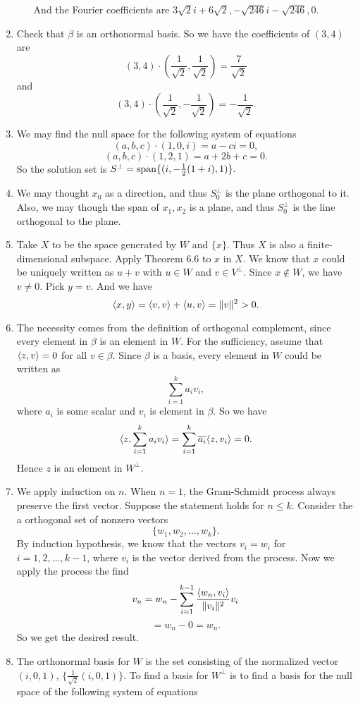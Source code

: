 \begin{enumerate}
\begin{enumerate}
And the Fourier coefficients are $3\sqrt{2}i+6\sqrt{2},-\sqrt{246}i-\sqrt{246},0$.
\end{enumerate}
\item Check that $\beta $ is an orthonormal basis. So we have the coefficients of $(3,4)$ are 
\[(3,4)\cdot (\frac{1}{\sqrt{2}},\frac{1}{\sqrt{2}})=\frac{7}{\sqrt{2}}\]
and 
\[(3,4)\cdot (\frac{1}{\sqrt{2}},-\frac{1}{\sqrt{2}})=-\frac{1}{\sqrt{2}}.\]
\item We may find the null space for the following system of equations
\[(a,b,c)\cdot (1,0,i)=a-ci=0,\]
\[(a,b,c)\cdot (1,2,1)=a+2b+c=0.\]
So the solution set is $S^{\perp}=\sp\{(i,-\frac{1}{2}(1+i),1)\}.$
\item We may thought $x_0$ as a direction, and thus $S_0^{\perp}$ is the plane orthogonal to it. Also, we may though the span of $x_1,x_2$ is a plane, and thus $S_0^{\perp}$ is the line orthogonal to the plane.
\item Take $X$ to be the space generated by $W$ and $\{x\}$. Thus $X$ is also a finite-dimensional subspace. Apply Theorem 6.6 to $x$ in $X$. We know that $x$ could be uniquely written as $u+v$ with $u\in W$ and $v\in V^{\perp}$. Since $x\notin W$, we have $v\neq 0$. Pick $y=v$. And we have 
\[\lag x,y\rag =\lag v,v\rag +\lag u,v\rag =\|v\|^2>0.\]
\item The necessity comes from the definition of orthogonal complement, since every element in $\beta $ is an element in $W$. For the sufficiency, assume that $\lag z,v\rag =0$ for all $v\in \beta $. Since $\beta $ is a basis, every element in $W$ could be written as 
\[\sum_{i=1}^k{a_iv_i},\]
where $a_i$ is some scalar and $v_i$ is element in $\beta$. So we have 
\[\lag z,\sum_{i=1}^k{a_iv_i}\rag =\sum_{i=1}^k{\overline{a_i}}\lag z,v_i\rag =0.\]
Hence $z$ is an element in $W^{\perp}$.
\item We apply induction on $n$. When $n=1$, the Gram-Schmidt process always preserve the first vector. Suppose the statement holds for $n\leq k$. Consider the a orthogonal set of nonzero vectors 
\[\{w_1,w_2,\ldots ,w_k\}.\]
By induction hypothesis, we know that the vectors $v_i=w_i$ for $i=1,2,\ldots ,k-1$, where $v_i$ is the vector derived from the process. Now we apply the process the find 
\[v_n=w_n-\sum_{i=1}^{k-1}{\frac{\lag w_n,v_i\rag }{\|v_i\|^2}v_i}\]
\[=w_n-0=w_n.\]
So we get the desired result.
\item The orthonormal basis for $W$ is the set consisting of the normalized vector $(i,0,1)$, $\{\frac{1}{\sqrt{2}}(i,0,1)\}$. To find a basis for $W^{\perp}$ is to find a basis for the null space of the following system of equations

\end{enumerate}
